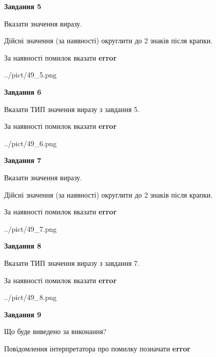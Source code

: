 \documentclass[11pt, ukrainian]{article}
\begin{document}
{\begin {large}
{\begin {center}\textbf{Завдання 5}\end {center}}\par
Вказати значення виразу. \par
Дійсні значення (за наявності) округлити до 2 знаків після крапки. \par
За наявності помилок вказати \textbf{error}

\begin{center}
	{../pict/49_5.png}
\end{center}
\newpage

{\begin {center}\textbf{Завдання 6}\end {center}}\par
Вказати ТИП значення виразу з завдання 5. \par
За наявності помилок вказати \textbf{error}

\begin{center}
	{../pict/49_6.png}
\end{center}
\newpage

{\begin {center}\textbf{Завдання 7}\end {center}}\par
Вказати значення виразу. \par
Дійсні значення (за наявності) округлити до 2 знаків після крапки. \par
За наявності помилок вказати \textbf{error}

\begin{center}
	{../pict/49_7.png}
\end{center}
\newpage

{\begin {center}\textbf{Завдання 8}\end {center}}\par
Вказати ТИП значення виразу з завдання 7. \par
За наявності помилок вказати \textbf{error}

\begin{center}
	{../pict/49_8.png}
\end{center}
\newpage

{\begin {center}\textbf{Завдання 9}\end {center}}\par
Що буде виведено за виконання? \par
Повідомлення інтерпретатора про помилку позначати \textbf{error}


\end{large}}
\end{document}
